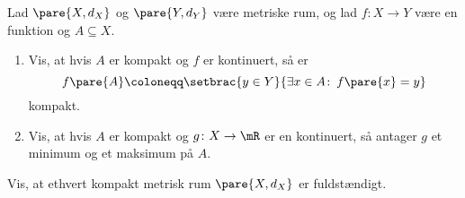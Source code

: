 \documentclass{article}
\begin{document}
\begin{opg}
Lad $\pare{X,d_X}$ og $\pare{Y,d_Y}$ være metriske rum, og lad $f\colon X\to Y$ være en funktion og $A\subseteq X$.
\begin{enumerate}
    \item Vis, at hvis $A$ er kompakt og $f$ er kontinuert, så er 
    $$ f\pare{A} \coloneqq \setbrac{y\in Y}{\exists x\in A\colon\, f\pare{x} = y} $$
    kompakt.
    
    \item Vis, at hvis $A$ er kompakt og $g\colon X\to \mR$ er en kontinuert, så antager $g$ et minimum og et maksimum på $A$.
\end{enumerate}
\end{opg}

\begin{opg}
Vis, at ethvert kompakt metrisk rum $\pare{X,d_X}$ er fuldstændigt.
\end{opg}



\end{document}
